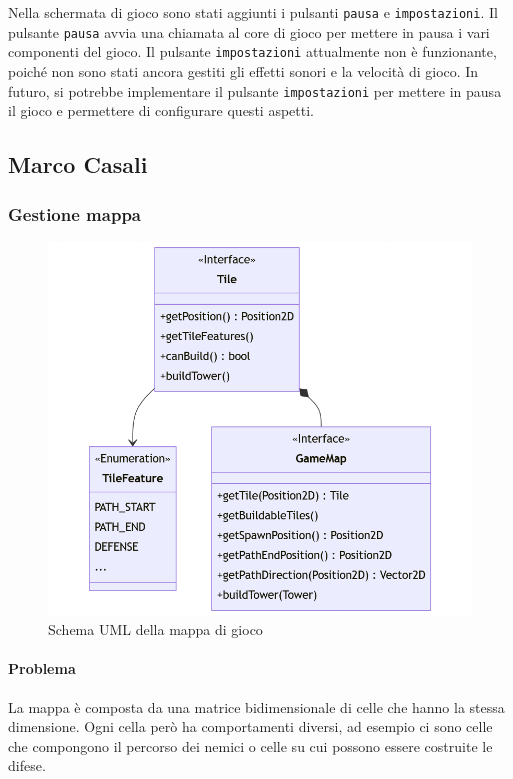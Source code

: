 \documentclass[a4paper,12pt]{report}
\begin{document}
Nella schermata di gioco sono stati aggiunti i pulsanti \texttt{pausa} e \texttt{impostazioni}. Il pulsante \texttt{pausa} avvia una chiamata al core di gioco per mettere in pausa i vari componenti del gioco. Il pulsante \texttt{impostazioni} attualmente non è funzionante, poiché non sono stati ancora gestiti gli effetti sonori e la velocità di gioco. In futuro, si potrebbe implementare il pulsante \texttt{impostazioni} per mettere in pausa il gioco e permettere di configurare questi aspetti.

\newpage
\subsection{Marco Casali}

\subsubsection{Gestione mappa}

\begin{figure}[H]
	\centering{}
	\includegraphics[width=\textwidth]{GameMap}
	\caption{Schema UML della mappa di gioco}
	\label{fig:GameMap}
\end{figure}

\paragraph{Problema} La mappa è composta da una matrice bidimensionale di celle che hanno la stessa dimensione. Ogni
cella però ha comportamenti diversi, ad esempio ci sono celle che compongono il percorso dei nemici o celle su cui
possono essere costruite le difese.
\end{document}
